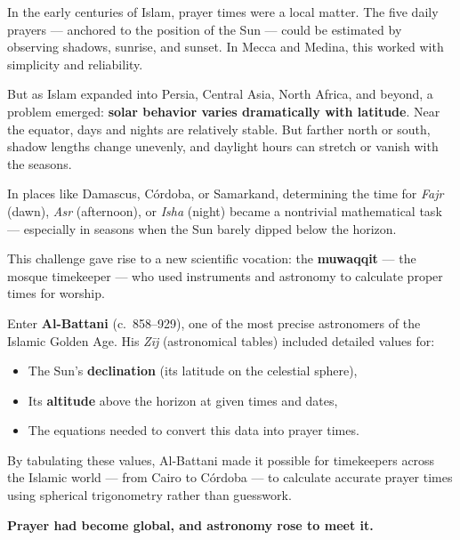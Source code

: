 \begin{tcolorbox}[colback=gray!5!white, colframe=black, title=\textbf{Historical Sidebar: When Prayer Became a Global Problem}, fonttitle=\bfseries, arc=1.5mm, boxrule=0.4pt]

    In the early centuries of Islam, prayer times were a local matter. The five daily prayers — anchored to the position of the Sun — could be estimated by observing shadows, sunrise, and sunset. In Mecca and Medina, this worked with simplicity and reliability.
    
    But as Islam expanded into Persia, Central Asia, North Africa, and beyond, a problem emerged: \textbf{solar behavior varies dramatically with latitude}. Near the equator, days and nights are relatively stable. But farther north or south, shadow lengths change unevenly, and daylight hours can stretch or vanish with the seasons.
    
    \medskip
    
    In places like Damascus, Córdoba, or Samarkand, determining the time for \textit{Fajr} (dawn), \textit{Asr} (afternoon), or \textit{Isha} (night) became a nontrivial mathematical task — especially in seasons when the Sun barely dipped below the horizon.
    
    \medskip
    
    This challenge gave rise to a new scientific vocation: the \textbf{muwaqqit} — the mosque timekeeper — who used instruments and astronomy to calculate proper times for worship.
    
    \medskip
    
    Enter \textbf{Al-Battani} (c.~858–929), one of the most precise astronomers of the Islamic Golden Age. His \textit{Zīj} (astronomical tables) included detailed values for:
    \begin{itemize}
      \item The Sun’s \textbf{declination} (its latitude on the celestial sphere),
      \item Its \textbf{altitude} above the horizon at given times and dates,
      \item The equations needed to convert this data into prayer times.
    \end{itemize}
    
    \medskip
    
    By tabulating these values, Al-Battani made it possible for timekeepers across the Islamic world — from Cairo to Córdoba — to calculate accurate prayer times using spherical trigonometry rather than guesswork.
    
    \medskip
    
    \textbf{Prayer had become global, and astronomy rose to meet it.}
    
\end{tcolorbox}








